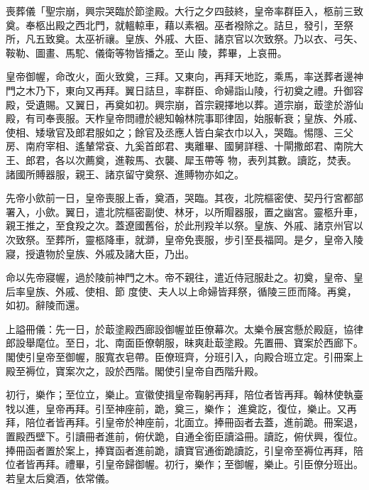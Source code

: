 
\begin{pinyinscope}

 喪葬儀「聖宗崩，興宗哭臨於節塗殿。大行之夕四鼓終，皇帝率群臣入，柩前三致奠。奉柩出殿之西北門，就轀輬車，藉以素裀。巫者襏除之。詰旦，發引，至祭所，凡五致奠。太巫祈禳。皇族、外戚、大臣、諸京官以次致祭。乃以衣、弓矢、鞍勒、圖畫、馬駝、儀衛等物皆播之。至山
 陵，葬畢，上哀冊。



 皇帝御幄，命改火，面火致奠，三拜。又東向，再拜天地訖，乘馬，率送葬者邊神門之木乃下，東向又再拜。翼日詰旦，率群臣、命婦詣山陵，行初奠之禮。升御容殿，受遺賜。又翼日，再奠如初。興宗崩，首宗親擇地以葬。道宗崩，菆塗於游仙殿，有司奉喪服。天柞皇帝問禮於總知翰林院事耶律固，始服斬衰；皇族、外戚、使相、矮墩官及郎君服如之；餘官及丞應人皆白枲衣巾以入，哭臨。惕隱、三父房、南府宰相、遙輦常袞、九奚首郎君、夷離畢、國舅詳穩、十閘撒郎君、南院大王、郎君，各以次薦奠，進鞍馬、衣襲、犀玉帶等
 物，表列其數。讀訖，焚表。諸國所賻器服，親王、諸京留守奠祭、進賻物亦如之。



 先帝小歛前一日，皇帝喪服上香，奠酒，哭臨。其夜，北院樞密使、契丹行宮都部署入，小歛。翼日，遣北院樞密副使、林牙，以所賵器服，置之幽宮。靈柩升車，親王推之，至食羖之次。蓋遼國舊俗，於此刑羖羊以祭。皇族、外戚、諸京州官以次致祭。至葬所，靈柩降車，就溮，皇帝免喪服，步引至長福岡。是夕，皇帝入陵寢，授遺物於皇族、外戚及諸大臣，乃出。



 命以先帝寢幄，過於陵前神門之木。帝不親往，遣近侍冠服赴之。初奠，皇帝、皇后率皇族、外戚、使相、節
 度使、夫人以上命婦皆拜祭，循陵三匝而降。再奠，如初。辭陵而還。



 上謚冊儀：先一日，於菆塗殿西廊設御幄並臣僚幕次。太樂令展宮懸於殿庭，協律郎設舉麾位。至日，北、南面臣僚朝服，昧爽赴菆塗殿。先置冊、寶案於西廊下。閣使引皇帝至御幄，服寬衣皂帶。臣僚班齊，分班引入，向殿合班立定。引冊案上殿至褥位，寶案次之，設於西階。閣使引皇帝自西階升殿。



 初行，樂作；至位立，樂止。宣徽使揖皇帝鞠躬再拜，陪位者皆再拜。翰林使執臺牫以進，皇帝再拜。引至神座前，跪，奠三，樂作；
 進奠訖，復位，樂止。又再拜，陪位者皆再拜。引皇帝於神座前，北面立。捧冊函者去蓋，進前跪。冊案退，置殿西壁下。引讀冊者進前，俯伏跪，自通全銜臣讀溢冊。讀訖，俯伏興，復位。捧冊函者置於案上，捧寶函者進前跪，讀寶官通銜跪讀訖，引皇帝至褥位再拜，陪位者皆再拜。禮畢，引皇帝歸御幄。初行，樂作；至御幄，樂止。引臣僚分班出。若皇太后奠酒，依常儀。




\end{pinyinscope}
